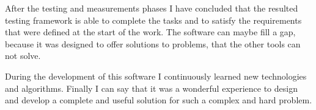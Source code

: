 After the testing and measurements phases I have concluded that the resulted testing framework is able to complete the tasks and to satisfy the requirements that were defined at the start of the work. The software can maybe fill a gap, because it was designed to offer solutions to problems, that the other tools can not solve.

During the development of this software I continuously learned new technologies and algorithms. Finally I can say that it was a wonderful experience to design and develop a complete and useful solution for such a complex and hard problem.



